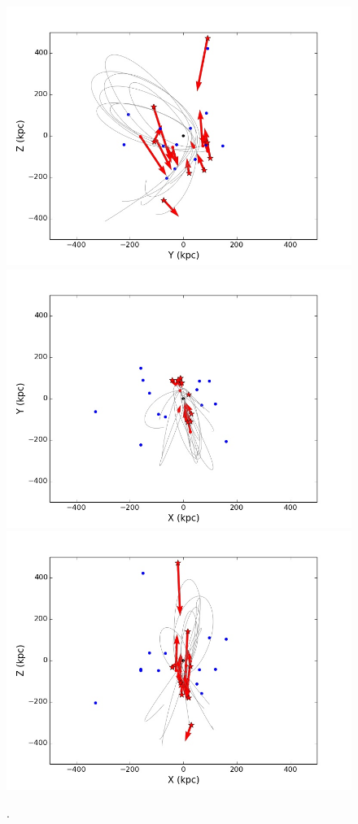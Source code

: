 \documentclass[useAMS,usenatbib]{mn2e}
\begin{document}
\begin{figure}
\includegraphics[width=\hsize]{yz_Bwd.jpg}\\
\includegraphics[width=0.5\hsize]{SnapshotSatellites_All_BeforeRotationM300_xy_All_Bwd_SSIMW_3000.jpg}\includegraphics[width=0.5\hsize]{SnapshotSatellites_All_BeforeRotationM300_xz_All_Bwd_SSIMW_3000.jpg}\\
\caption{.}
\label{fig:StreamPlaneOrbit}
\end{figure}

\end{document}
